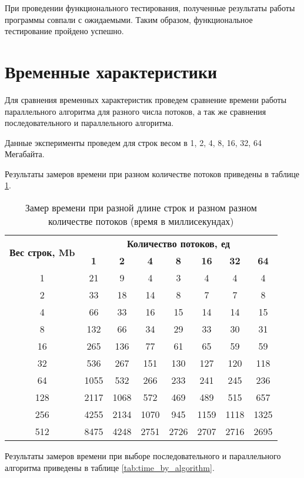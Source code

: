         
        При проведении функционального тестирования, полученные результаты работы программы совпали с ожидаемыми. Таким образом, функциональное тестирование пройдено успешно.
    
    \section{Временные характеристики}
    
        Для сравнения временных характеристик проведем сравнение времени работы параллельного алгоритма для разного числа потоков, а так же сравнения последовательного и параллельного алгоритма.
        
        Данные эксперименты проведем для строк весом в 1, 2, 4, 8, 16, 32, 64 Мегабайта.
        
        Результаты замеров времени при разном количестве потоков приведены в таблице \ref{tab:time_by_th_num}.
        
        \begin{table}[]
            \centering
            \caption{Замер времени при разной длине строк и разном разном количестве потоков (время в миллисекундах)}
            \begin{tabular}{|c|c|c|c|c|c|c|c|}
\hline \multirow{2}{*}{\textbf{Вес строк, Mb}} &\multicolumn{7}{c|}{\textbf{Количество потоков, ед}} \\
\cline{2-8} &\textbf{1}&\textbf{2}&\textbf{4}&\textbf{8}&\textbf{16}&\textbf{32}&\textbf{64} \\
\hline 1&21&9&4&3&4&4&4 \\
\hline 2&33&18&14&8&7&7&8 \\
\hline 4&66&33&16&15&14&14&15 \\
\hline 8&132&66&34&29&33&30&31 \\
\hline 16&265&136&77&61&65&59&59 \\
\hline 32&536&267&151&130&127&120&118 \\
\hline 64&1055&532&266&233&241&245&236 \\
\hline 128&2117&1068&572&469&489&515&657 \\
\hline 256&4255&2134&1070&945&1159&1118&1325 \\
\hline 512&8475&4248&2751&2726&2707&2716&2695 \\
\hline
            \end{tabular}
            \label{tab:time_by_th_num}
        \end{table}
        
        Результаты замеров времени при выборе последовательного и параллельного алгоритма приведены в таблице \ref{tab:time_by_algorithm}.
        
